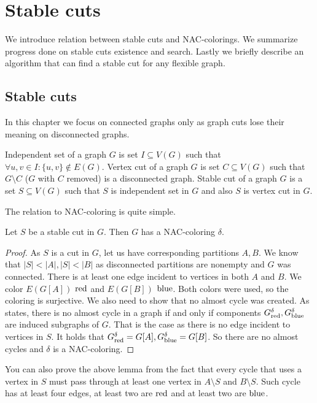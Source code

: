 
\chapter{Stable cuts}

\begin{chapterabstract}
	We introduce relation between stable cuts and NAC-colorings.
	We summarize progress done on stable cuts existence and search.
	Lastly we briefly describe an algorithm that can find a stable cut
	for any flexible graph.
\end{chapterabstract}

\section{Stable cuts}

In this chapter we focus on connected graphs only as graph cuts lose their
meaning on disconnected graphs.
%
\begin{definition}
	Independent set of a graph \( G \) is set \( I \subseteq V(G) \)
	such that \( \forall u, v \in I : \{u, v\} \not\in E(G) \).
	Vertex cut of a graph \( G \) is set \( C \subseteq V(G) \)
	such that \( G \setminus C \) (\( G \) with \( C \) removed)
	is a disconnected graph.
	Stable cut of a graph \( G \) is a set \( S \subseteq V(G) \) such that
	\( S \) is independent set in \( G \) and also \( S \) is vertex cut in \( G \).
\end{definition}
%

The relation to NAC-coloring is quite simple.
%
\begin{lemma}
	Let \( S \) be a stable cut in \( G \).
	Then \( G \) has a NAC-coloring \( \delta \).
\end{lemma}
%
\begin{proof}
	As \( S \) is a cut in \( G \), let us have corresponding partitions \( A, B \).
	We know that \( |S| < |A|, |S| < |B| \)
	as disconnected partitions are nonempty and \( G \) was connected.
	There is at least one edge incident to vertices in both \( A \) and \( B \).
	We color \( E(G[A]) \) \( \text{red} \) and \( E(G[B]) \) \( \text{blue} \).
	Both colors were used, so the coloring is surjective.
	We also need to show that no almost cycle was created.
	As~\cite[Lemma 2.4]{legersky_original} states, there is no almost cycle
	in a graph if and only if components \( G_{\text{red}}^\delta, G_{\text{blue}}^\delta \)
	are induced subgraphs of \( G \).
	That is the case as there is no edge incident to vertices in \( S \).
	It holds that \( G_{\text{red}}^\delta = G[A], G_{\text{blue}}^\delta = G[B] \).
	So there are no almost cycles and \( \delta \) is a NAC-coloring.
\end{proof}
%
You can also prove the above lemma from the fact that every cycle that
uses a vertex in \( S \) must pass
through at least one vertex in \( A \setminus S \) and \( B \setminus S \).
Such cycle has at least four edges,
at least two are \( \text{red} \) and at least two are \( \text{blue} \).

